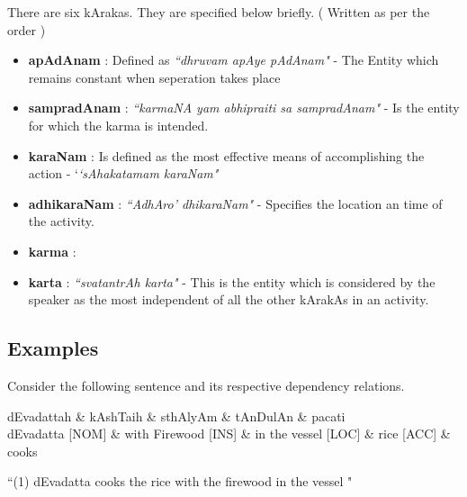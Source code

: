 \documentclass[twoside]{article}
\begin{document}
There are six kArakas. They are specified below briefly. ( Written as per the order )

  \begin{itemize}
    \item \textbf{apAdAnam}  :  Defined as \textit{``dhruvam apAye pAdAnam"} - The Entity which remains constant when seperation takes place
    \item \textbf{sampradAnam}  : \textit{``karmaNA yam abhipraiti sa sampradAnam"} - Is the entity for which the karma is intended. 
    \item \textbf{karaNam} : Is defined as the most effective means of accomplishing the action - `\textit{`sAhakatamam karaNam"}
    \item \textbf{adhikaraNam} : \textit{``AdhAro' dhikaraNam"} - Specifies the location an time of the activity.
    \item \textbf{karma} :  
    \item \textbf{karta} : \textit{``svatantrAh karta"} - This is the entity which is considered by the speaker as the most independent of all the other kArakAs in an activity.
  \end{itemize}

\subsection{Examples}
Consider the following sentence and its respective dependency relations.

\hypertarget{fig1}{}
\begin{center}
\begin{dependency}[arc edge, arc angle=80, text only label, label style={above}]
   \begin{deptext}[column sep=1em]
      dEvadattah \& kAshTaih \& sthAlyAm \& tAnDulAn \& pacati \\
      dEvadatta [NOM] \& with Firewood [INS] \& in the vessel [LOC] \& rice [ACC]  \& cooks \\
   \end{deptext}
   
\end{dependency} 

 ``(1) dEvadatta cooks the rice with the firewood in the vessel " 
 

\end{center}
\end{document}
